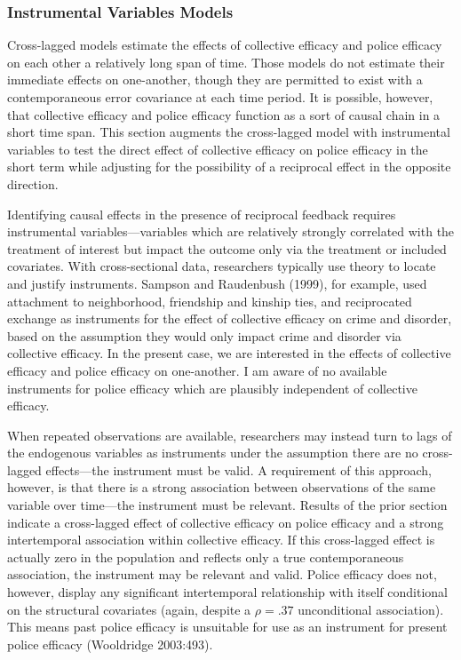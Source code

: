 \documentclass [11pt, proquest] {uwthesis}[2015/03/03]
\begin{document}
\hypertarget{instrumental-variables-models}{%
\subsubsection{Instrumental Variables Models}\label{instrumental-variables-models}}

Cross-lagged models estimate the effects of collective efficacy and police efficacy on each other a relatively long span of time. Those models do not estimate their immediate effects on one-another, though they are permitted to exist with a contemporaneous error covariance at each time period. It is possible, however, that collective efficacy and police efficacy function as a sort of causal chain in a short time span. This section augments the cross-lagged model with instrumental variables to test the direct effect of collective efficacy on police efficacy in the short term while adjusting for the possibility of a reciprocal effect in the opposite direction.

Identifying causal effects in the presence of reciprocal feedback requires instrumental variables---variables which are relatively strongly correlated with the treatment of interest but impact the outcome only via the treatment or included covariates. With cross-sectional data, researchers typically use theory to locate and justify instruments. Sampson and Raudenbush (1999), for example, used attachment to neighborhood, friendship and kinship ties, and reciprocated exchange as instruments for the effect of collective efficacy on crime and disorder, based on the assumption they would only impact crime and disorder via collective efficacy. In the present case, we are interested in the effects of collective efficacy and police efficacy on one-another. I am aware of no available instruments for police efficacy which are plausibly independent of collective efficacy.

When repeated observations are available, researchers may instead turn to lags of the endogenous variables as instruments under the assumption there are no cross-lagged effects---the instrument must be valid. A requirement of this approach, however, is that there is a strong association between observations of the same variable over time---the instrument must be relevant. Results of the prior section indicate a cross-lagged effect of collective efficacy on police efficacy and a strong intertemporal association within collective efficacy. If this cross-lagged effect is actually zero in the population and reflects only a true contemporaneous association, the instrument may be relevant and valid. Police efficacy does not, however, display any significant intertemporal relationship with itself conditional on the structural covariates (again, despite a \(\rho = .37\) unconditional association). This means past police efficacy is unsuitable for use as an instrument for present police efficacy (Wooldridge 2003:493).
\end{document}
